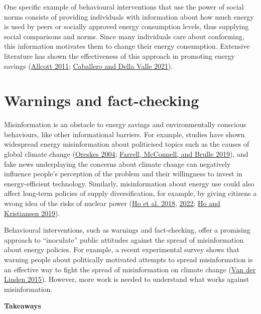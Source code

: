 \documentclass[
  12pt,
  captions=heading]{scrreport}
\begin{document}
One specific example of behavioural interventions that use the power of
social norms consists of providing individuals with information about
how much energy is used by peers or socially approved energy consumption
levels, thus supplying social comparisons and norms. Since many
individuals care about conforming, this information motivates them to
change their energy consumption. Extensive literature has shown the
effectiveness of this approach in promoting energy savings
(\protect\hyperlink{ref-allcott2011social}{Allcott 2011};
\protect\hyperlink{ref-caballero2021tackling}{Caballero and Della Valle
2021}).

\hypertarget{warnings-and-fact-checking}{%
\section{Warnings and fact-checking}\label{warnings-and-fact-checking}}

Misinformation is an obstacle to energy savings and environmentally
conscious behaviours, like other informational barriers. For example,
studies have shown widespread energy misinformation about politicised
topics such as the causes of global climate change
(\protect\hyperlink{ref-oreskes2004scientific}{Oreskes 2004};
\protect\hyperlink{ref-farrell2019evidence}{Farrell, McConnell, and
Brulle 2019}), and fake news underplaying the concerns about climate
change can negatively influence people's perception of the problem and
their willingness to invest in energy-efficient technology. Similarly,
misinformation about energy use could also affect long-term policies of
supply diversification, for example, by giving citizens a wrong idea of
the risks of nuclear power (\protect\hyperlink{ref-ho2018can}{Ho et al.
2018}, \protect\hyperlink{ref-ho2022fake}{2022};
\protect\hyperlink{ref-ho2019environmental}{Ho and Kristiansen 2019}).

Behavioural interventions, such as warnings and fact-checking, offer a
promising approach to ``inoculate'' public attitudes against the spread
of misinformation about energy policies. For example, a recent
experimental survey shows that warning people about politically
motivated attempts to spread misinformation is an effective way to fight
the spread of misinformation on climate change
(\protect\hyperlink{ref-van2015social}{Van der Linden 2015}). However,
more work is needed to understand what works against misinformation.

\textbf{Takeaways}
\end{document}
